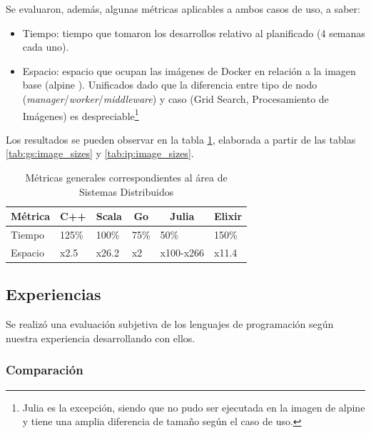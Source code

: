 \documentclass[11pt]{article}
\let\Oldsubsection\subsection
\renewcommand{\subsection}{\FloatBarrier\Oldsubsection}
\let\Oldsubsubsection\subsubsection
\renewcommand{\subsubsection}{\FloatBarrier\Oldsubsubsection}
\newcommand{\english}[1]{\textit{#1}}
\begin{document}
Se evaluaron, además, algunas métricas aplicables a ambos casos de uso, a saber:

\begin{itemize}
    \item Tiempo: tiempo que tomaron los desarrollos relativo al planificado (4 semanas cada uno).
    \item Espacio: espacio que ocupan las imágenes de Docker en relación a la imagen base (alpine \cite{metrics:apline}). Unificados dado que la diferencia entre tipo de nodo (\english{manager}/\english{worker}/\english{middleware}) y caso (Grid Search, Procesamiento de Imágenes) es despreciable\footnote{Julia es la excepción, siendo que no pudo ser ejecutada en la imagen de alpine y tiene una amplia diferencia de tamaño según el caso de uso.}
\end{itemize}

Los resultados se pueden observar en la tabla \ref{tab:sis_dist:general_metrics}, elaborada a partir de las tablas \ref{tab:gs:image_sizes} y \ref{tab:ip:image_sizes}.

\begin{table}
\centering
\begin{tabular}{|l|l|l|l|l|l|}
\hline
\multicolumn{1}{|c|}{Métrica} & \multicolumn{1}{c|}{C++} & \multicolumn{1}{c|}{Scala} & \multicolumn{1}{c|}{Go} & \multicolumn{1}{c|}{Julia} & \multicolumn{1}{c|}{Elixir} \\ \hline
Tiempo                        & 125\%                    & 100\%                      & 75\%                    & 50\%                       & 150\%                       \\ \hline
Espacio                       & x2.5                     & x26.2                      & x2                      & x100-x266                  & x11.4                       \\ \hline
\end{tabular}
\caption{Métricas generales correspondientes al área de Sistemas Distribuidos}
\label{tab:sis_dist:general_metrics}
\end{table}

\subsection{Experiencias}

Se realizó una evaluación subjetiva de los lenguajes de programación según nuestra experiencia desarrollando con ellos.

\subsubsection{Comparación} \label{sec:subjective_comparison}
\end{document}
